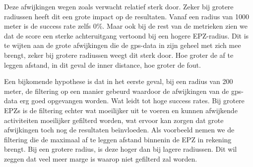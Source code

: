 Deze afwijkingen wegen zoals verwacht relatief sterk door. Zeker bij grotere
radiussen heeft dit een grote impact op de resultaten. Vanaf een radius van
1000 meter is de success rate zelfs 0\%. Maar ook bij de rest van de metrieken
zien we dat de score een sterke achteruitgang vertoond bij een hogere
\ac{EPZ}-radius. Dit is te wijten aan de grote afwijkingen die de \ac{gps}-data
in zijn geheel met zich mee brengt, zeker bij grotere radiussen weegt dit sterk
door. Hoe groter de af te leggen afstand, in dit geval de inner distance, hoe
groter de fout.

Een bijkomende hypothese is dat in het eerste geval, bij een radius van 200
meter, de filtering op een manier gebeurd waardoor de afwijkingen van de
\ac{gps}-data erg goed opgevangen worden. Wat leidt tot hoge success rates. Bij
grotere \acp{EPZ} is de filtering echter wat moeilijker uit te voeren en kunnen
afwijkende activiteiten moeilijker gefilterd worden, wat ervoor kan zorgen dat
grote afwijkingen toch nog de resultaten beïnvloeden. Als voorbeeld nemen we de
filtering die de maximaal af te leggen afstand binnenin de \ac{EPZ} in rekening
brengt. Bij een grotere radius, is deze hoger dan bij lagere radiussen. Dit wil
zeggen dat veel meer marge is waarop niet gefilterd zal worden.

